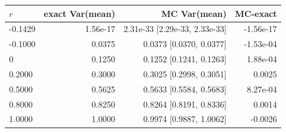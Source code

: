 \begin{tabular}{lrrr}
\toprule
$r$ & exact Var(mean) & MC Var(mean) & MC-exact \\
\midrule
-0.1429 & 1.56e-17 & 2.31e-33 [2.29e-33, 2.33e-33] & -1.56e-17 \\
-0.1000 & 0.0375 & 0.0373 [0.0370, 0.0377] & -1.53e-04 \\
0 & 0.1250 & 0.1252 [0.1241, 0.1263] & 1.88e-04 \\
0.2000 & 0.3000 & 0.3025 [0.2998, 0.3051] & 0.0025 \\
0.5000 & 0.5625 & 0.5633 [0.5584, 0.5683] & 8.27e-04 \\
0.8000 & 0.8250 & 0.8264 [0.8191, 0.8336] & 0.0014 \\
1.0000 & 1.0000 & 0.9974 [0.9887, 1.0062] & -0.0026 \\
\bottomrule
\end{tabular}
